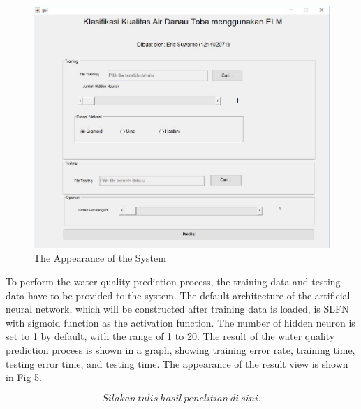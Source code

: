 \documentclass[journal,comsoc]{IEEEtran}
\let\MYoriglatexcaption\caption
\renewcommand{\caption}[2][\relax]{\MYoriglatexcaption[#2]{#2}}
\begin{document}
\begin{figure}[!th]
\centering
\includegraphics[scale=0.2]{fig-4.jpg}
\caption{The Appearance of the System}
\label{fig4}
\end{figure}

To perform the water quality prediction process, the training data and testing data have to be provided to the system. The default architecture of the artificial neural network, which will be constructed after training data is loaded, is SLFN with sigmoid function as the activation function. The number of hidden neuron is set to 1 by default, with the range of 1 to 20. The result of the water quality prediction process is shown in a graph, showing training error rate, training time, testing error time, and testing time. The appearance of the result view is shown in Fig 5.


    \[Silakan~tulis~hasil~penelitian~di~sini.\]


\end{document}
